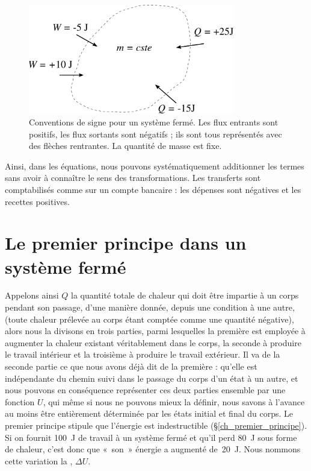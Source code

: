 		\begin{figure}
			\begin{center}
				\includegraphics[width=9cm]{images/convention_systeme_ferme.png}
			\end{center}
			\caption{Conventions de signe pour un système fermé. Les flux entrants sont positifs, les flux sortants sont négatifs ; ils sont tous représentés avec des flèches rentrantes. La quantité de masse est fixe.}
			\label{fig_convention_signe_sf}
		\end{figure}

		Ainsi, dans les équations, nous pouvons systématiquement additionner les termes sans avoir à connaître le sens des transformations. Les transferts sont comptabilisés comme sur  un compte bancaire : les dépenses sont négatives et les recettes positives.



\section{Le premier principe dans un système fermé}
\label{ch_premier_principe_sf}

		Appelons ainsi $Q$ la quantité totale de chaleur qui doit être impartie à un corps pendant son passage, d’une manière donnée, depuis une condition à une autre, (toute chaleur prélevée au corps étant comptée comme une quantité négative), alors nous la divisons en trois parties, parmi lesquelles la première est employée à augmenter la chaleur existant véritablement dans le corps, la seconde à produire le travail intérieur et la troisième à produire le travail extérieur. Il va de la seconde partie ce que nous avons déjà dit de la première : qu’elle est indépendante du chemin suivi dans le passage du corps d’un état à un autre, et nous pouvons en conséquence  représenter ces deux parties ensemble par une fonction $U$, qui même si nous ne pouvons mieux la définir, nous savons à l’avance au moins être entièrement déterminée par les états initial et final du corps.
	Le premier principe stipule que l’énergie est indestructible (\S\ref{ch_premier_principe}). Si on fournit \SI{100}{\joule} de travail à un système fermé et qu’il perd \SI{80}{\joule} sous forme de chaleur, c’est donc que «~son~» énergie a augmenté de~\SI{20}{\joule}. Nous nommons cette variation la , $\Delta U$. 
	
